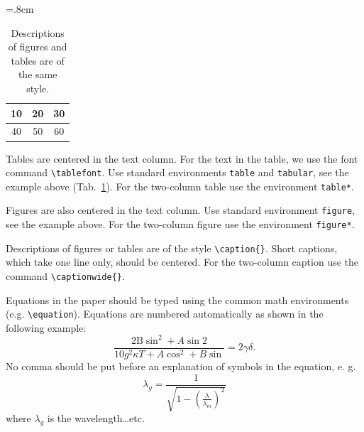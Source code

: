 \documentclass{poster15}
\begin{document}
%
\begin{table}[h]
\begin{center}
{\renewcommand{\arraystretch}{1.4}
\tabcolsep=.8cm
\tablefont
\begin{tabular}{|c|c|c|}
\hline
10
&20
&30\\
\hline
40
&50
&60\\
\hline
\end{tabular}}
\caption{Descriptions of figures and tables are of the same style.}
\label{tab}
\end{center}
\end{table}
Tables are centered in the text column. For the text in the table, we use the font command \verb+\tablefont+. Use standard environments \verb+table+ and \verb+tabular+, see the example above (Tab.~\ref{tab}). For the two-column table use the environment \verb+table*+. 

Figures are also centered in the text column. Use standard environment \verb+figure+, see the example above. For the two-column figure use the environment \verb+figure*+. 

Descriptions of figures or tables are of the style \verb+\caption{}+. Short captions, which take one line only, should be centered. For the two-column caption use the command \verb+\captionwide{}+.

Equations in the paper should be typed using the common math  environments (e.g. \verb+\equation+). Equations are numbered automatically as shown in the following example:
\begin{equation}
\frac{2\mathrm{B} \sin^2 + A \sin2}{10 g^2 \kappa T + A \cos^2 + B \sin}= 2 \gamma\delta .
\end{equation}
No comma should be put before an explanation of symbols in the equation, e. g. 
\begin{equation}
       \lambda_g =\frac{1}{\sqrt{1-\left(\frac{\lambda}{\lambda_m}\right)^2}}
\end{equation}	
where $\lambda_g$ is the wavelength\dots etc.
\end{document}

